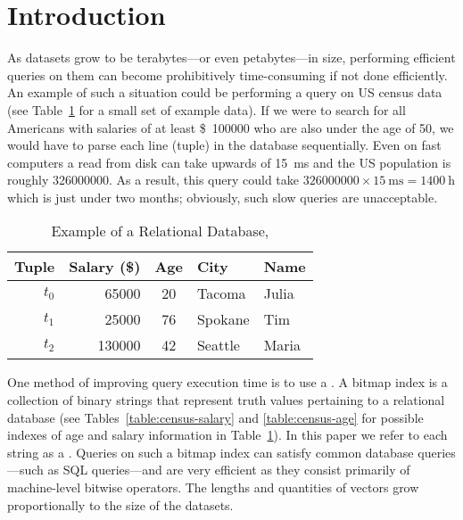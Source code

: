 \section{Introduction}
As datasets grow to be terabytes---or even petabytes---in size, performing
efficient queries on them can become prohibitively time-consuming if not done
efficiently. An example of such a situation could be performing a query on US
census data (see Table~\ref{table:census-relational} for a small set of example
data). If we were to search for all Americans with salaries of at least
\SI{100000}[\$]{} who are also under the age of 50, we would have to parse each
line (tuple) in the database sequentially. Even on fast computers a read from
disk can take upwards of \SI{15}{\milli\second} and the US population is
roughly \num{326000000}. As a result, this query could take
\(\num{326 000 000} \times \SI{15}{\milli\second} = \SI{1400}{\hour}\)
which is just under two months; obviously, such slow queries are unacceptable.
\begin{table}[H]
    \centering
    \caption{Example of a Relational Database, }
    \label{table:census-relational}
    \begin{tabular}{@{}r||rcll@{}}
        \toprule
        Tuple   & Salary (\$)  & Age & City    & Name  \\
        \midrule
        \(t_0\) & \num{65000}  & 20  & Tacoma  & Julia \\
        \(t_1\) & \num{25000}  & 76  & Spokane & Tim   \\
        \(t_2\) & \num{130000} & 42  & Seattle & Maria \\
        \bottomrule
    \end{tabular}
\end{table}
\par
One method of improving query execution time is to use a . A
bitmap index is a collection of binary strings that represent truth values
pertaining to a relational database (see Tables~\ref{table:census-salary} and
\ref{table:census-age} for possible indexes of age and salary information in
Table~\ref{table:census-relational}). In this paper we refer to each string as
a . Queries on such a bitmap index can satisfy common
database queries---such as SQL  queries---and are very
efficient as they consist primarily of machine-level bitwise operators. The
lengths and quantities of vectors grow proportionally to the size of the
datasets.
